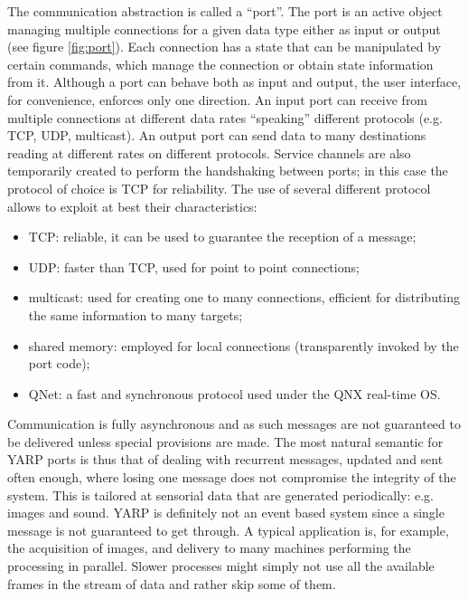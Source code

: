 The communication abstraction is called a ``port''. The port is an active object managing
multiple connections for a given data type either as input or output (see figure \ref{fig:port}). Each connection has
a state that can be manipulated by certain commands, which manage the connection or obtain
state information from it. Although a port can behave both as input and output, the 
user interface, for convenience, enforces only one direction. An input port can receive 
from multiple connections at different data rates ``speaking'' different protocols
(e.g. TCP, UDP, multicast). An output port can send data to many destinations reading at
different rates on different protocols. Service channels are also temporarily created to
perform the handshaking between ports; in this case the protocol of choice is TCP for
reliability. The use of several different protocol allows to exploit at best their 
characteristics:
\begin{itemize} \pflist
	\item TCP: reliable, it can be used to guarantee the reception of a message;
	\item UDP: faster than TCP, used for point to point connections;
	\item multicast: used for creating one to many connections, efficient for distributing
	the same information to many targets;
	\item shared memory: employed for local connections (transparently invoked by the port
	code);
	\item QNet: a fast and synchronous protocol used under the QNX real-time OS.
\end{itemize}

Communication is fully asynchronous and as such messages are not guaranteed to be 
delivered unless special provisions are made. The most natural semantic for YARP ports is
thus that of dealing with recurrent messages, updated and sent often enough, where losing 
one message does not compromise the integrity of the system. This is tailored at
sensorial data that are generated periodically: e.g. images and sound. YARP is definitely
not an event based system since a single message is not guaranteed to get through. A
typical application is, for example, the acquisition of images, and delivery to many 
machines performing the processing in parallel. Slower processes might simply not
use all the available frames in the stream of data and rather skip some of them.

